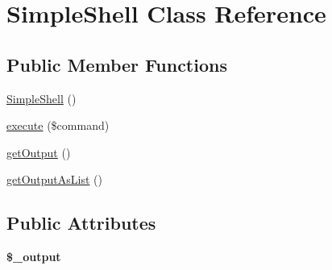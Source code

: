 \hypertarget{class_simple_shell}{
\section{SimpleShell Class Reference}
\label{class_simple_shell}
}
\subsection*{Public Member Functions}
\begin{DoxyCompactItemize}
\item 
\hyperlink{class_simple_shell_a78ce94ced3359a08496e33956aee82d3}{SimpleShell} ()
\item 
\hyperlink{class_simple_shell_af50daa9990b46e1e978c6f17c371238d}{execute} (\$command)
\item 
\hyperlink{class_simple_shell_ad4bbebad7ddf292f1acaffc00ec85dd0}{getOutput} ()
\item 
\hyperlink{class_simple_shell_a986a839480a739e7fc9b14864bfa7e20}{getOutputAsList} ()
\end{DoxyCompactItemize}
\subsection*{Public Attributes}
\begin{DoxyCompactItemize}
\item 
\hypertarget{class_simple_shell_adf2a54735b82c2975b0f1f09de0954dd}{
{\bfseries \$\_\-output}}
\label{class_simple_shell_adf2a54735b82c2975b0f1f09de0954dd}

\end{DoxyCompactItemize}


